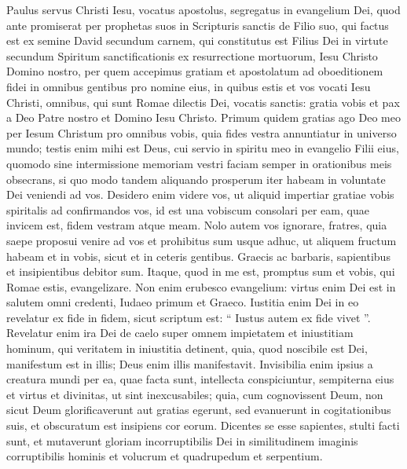 \begin{biblechapter}
 \verse Paulus servus Christi Iesu, vocatus apostolus, segregatus in evangelium Dei, 
\verse quod ante promiserat per prophetas suos in Scripturis sanctis 
\verse de Filio suo, qui factus est ex semine David secundum carnem, 
\verse qui constitutus est Filius Dei in virtute secundum Spiritum sanctificationis ex resurrectione mortuorum, Iesu Christo Domino nostro, 
\verse per quem accepimus gratiam et apostolatum ad oboeditionem fidei in omnibus gentibus pro nomine eius, 
\verse in quibus estis et vos vocati Iesu Christi, 
 \verse omnibus, qui sunt Romae dilectis Dei, vocatis sanctis: gratia vobis et pax a Deo Patre nostro et Domino Iesu Christo.
 \verse Primum quidem gratias ago Deo meo per Iesum Christum pro omnibus vobis, quia fides vestra annuntiatur in universo mundo; 
\verse testis enim mihi est Deus, cui servio in spiritu meo in evangelio Filii eius, quomodo sine intermissione memoriam vestri faciam 
\verse semper in orationibus meis obsecrans, si quo modo tandem aliquando prosperum iter habeam in voluntate Dei veniendi ad vos. 
\verse Desidero enim videre vos, ut aliquid impertiar gratiae vobis spiritalis ad confirmandos vos, 
\verse id est una vobiscum consolari per eam, quae invicem est, fidem vestram atque meam. 
\verse Nolo autem vos ignorare, fratres, quia saepe proposui venire ad vos et prohibitus sum usque adhuc, ut aliquem fructum habeam et in vobis, sicut et in ceteris gentibus. 
\verse Graecis ac barbaris, sapientibus et insipientibus debitor sum. 
\verse Itaque, quod in me est, promptus sum et vobis, qui Romae estis, evangelizare.
 \verse Non enim erubesco evangelium: virtus enim Dei est in salutem omni credenti, Iudaeo primum et Graeco. 
\verse Iustitia enim Dei in eo revelatur ex fide in fidem, sicut scriptum est: “ Iustus autem ex fide vivet ”.
 \verse Revelatur enim ira Dei de caelo super omnem impietatem et iniustitiam hominum, qui veritatem in iniustitia detinent, 
\verse quia, quod noscibile est Dei, manifestum est in illis; Deus enim illis manifestavit. 
\verse Invisibilia enim ipsius a creatura mundi per ea, quae facta sunt, intellecta conspiciuntur, sempiterna eius et virtus et divinitas, ut sint inexcusabiles; 
\verse quia, cum cognovissent Deum, non sicut Deum glorificaverunt aut gratias egerunt, sed evanuerunt in cogitationibus suis, et obscuratum est insipiens cor eorum. 
\verse Dicentes se esse sapientes, stulti facti sunt, 
\verse et mutaverunt gloriam incorruptibilis Dei in similitudinem imaginis corruptibilis hominis et volucrum et quadrupedum et serpentium.

\end{biblechapter}
